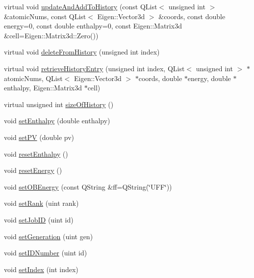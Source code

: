 \begin{DoxyCompactItemize}
\item 
virtual void \hyperlink{classGlobalSearch_1_1Structure_a9e200fa25c362859fdf2cecfd4cbaf06}{update\-And\-Add\-To\-History} (const Q\-List$<$ unsigned int $>$ \&atomic\-Nums, const Q\-List$<$ Eigen\-::\-Vector3d $>$ \&coords, const double energy=0, const double enthalpy=0, const Eigen\-::\-Matrix3d \&cell=Eigen\-::\-Matrix3d\-::\-Zero())
\item 
virtual void \hyperlink{classGlobalSearch_1_1Structure_ab1f8dc25ec23c06bd8edac7b0f719906}{delete\-From\-History} (unsigned int index)
\item 
virtual void \hyperlink{classGlobalSearch_1_1Structure_aaf7c1811bcc7f591e2f6bccd9e56e18f}{retrieve\-History\-Entry} (unsigned int index, Q\-List$<$ unsigned int $>$ $\ast$atomic\-Nums, Q\-List$<$ Eigen\-::\-Vector3d $>$ $\ast$coords, double $\ast$energy, double $\ast$enthalpy, Eigen\-::\-Matrix3d $\ast$cell)
\item 
virtual unsigned int \hyperlink{classGlobalSearch_1_1Structure_a92fb3f639890b9005c0559fcf843c45c}{size\-Of\-History} ()
\item 
void \hyperlink{classGlobalSearch_1_1Structure_a3f0ef2f62e4467c70044bbf3965b6a26}{set\-Enthalpy} (double enthalpy)
\item 
void \hyperlink{classGlobalSearch_1_1Structure_a4eda6eb8ce8080fae9fe91587039e748}{set\-P\-V} (double pv)
\item 
void \hyperlink{classGlobalSearch_1_1Structure_a947839b5088f6829b81ef7f9f9938b04}{reset\-Enthalpy} ()
\item 
void \hyperlink{classGlobalSearch_1_1Structure_aa3a2350ff9b13a7b84337f66a1d18cf5}{reset\-Energy} ()
\item 
void \hyperlink{classGlobalSearch_1_1Structure_a52962ac4b557250b84d27e90799d18d0}{set\-O\-B\-Energy} (const Q\-String \&ff=Q\-String(\char`\"{}U\-F\-F\char`\"{}))
\item 
void \hyperlink{classGlobalSearch_1_1Structure_a2c7020f0ea0bfb58f37dffc6e5d955be}{set\-Rank} (uint rank)
\item 
void \hyperlink{classGlobalSearch_1_1Structure_adbb752fe62009e8adbb55cc1fdef0de1}{set\-Job\-I\-D} (uint id)
\item 
void \hyperlink{classGlobalSearch_1_1Structure_a2c3d51c041d38d172f3169d8c8d31b45}{set\-Generation} (uint gen)
\item 
void \hyperlink{classGlobalSearch_1_1Structure_a9ecf515564a4063d37ab1d0a8eb14d11}{set\-I\-D\-Number} (uint id)
\item 
void \hyperlink{classGlobalSearch_1_1Structure_a9f25226379d189f1bfd9e4698585c2e9}{set\-Index} (int index)

\end{DoxyCompactItemize}
